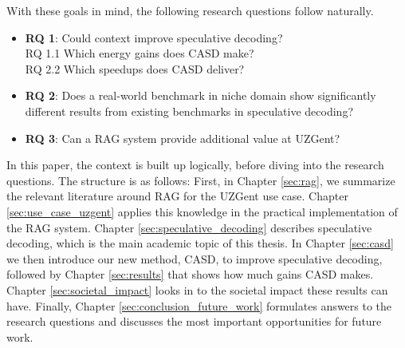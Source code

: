 With these goals in mind, the following research questions follow naturally.

\begin{itemize}
    \item \textbf{RQ 1}: Could context improve speculative decoding? \\ RQ 1.1 Which energy gains does CASD make? \\ RQ 2.2 Which speedups does CASD deliver?
    \item \textbf{RQ 2}: Does a real-world benchmark in niche domain show significantly different results from existing benchmarks in speculative decoding?
    \item \textbf{RQ 3}: Can a RAG system provide additional value at UZGent?
\end{itemize}

In this paper, the context is built up logically, before diving into the research questions. The structure is as follows: First, in Chapter \ref{sec:rag}, we summarize the relevant literature around RAG for the UZGent use case. Chapter \ref{sec:use_case_uzgent} applies this knowledge in the practical implementation of the RAG system. Chapter \ref{sec:speculative_decoding} describes speculative decoding, which is the main academic topic of this thesis. In Chapter \ref{sec:casd} we then introduce our new method, CASD, to improve speculative decoding, followed by Chapter \ref{sec:results} that shows how much gains CASD makes. Chapter \ref{sec:societal_impact} looks in to the societal impact these results can have. Finally, Chapter \ref{sec:conclusion_future_work} formulates answers to the research questions and discusses the most important opportunities for future work.\\